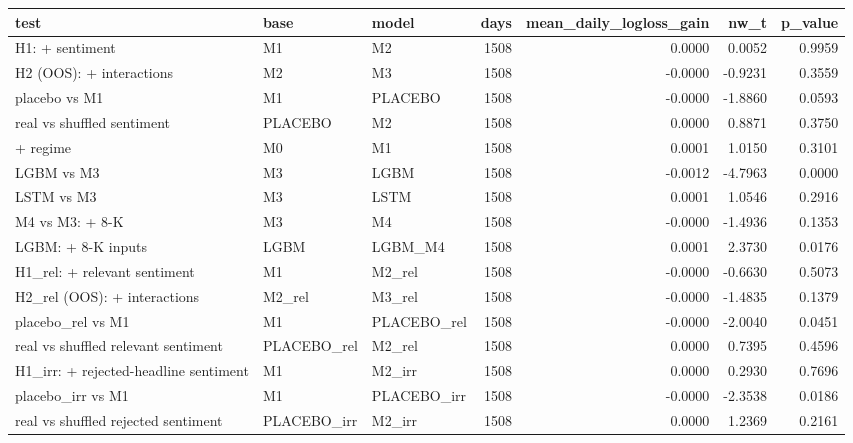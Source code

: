 \begin{tabular}{lllrrrr}
\toprule
test & base & model & days & mean\_daily\_logloss\_gain & nw\_t & p\_value \\
\midrule
H1: + sentiment & M1 & M2 & 1508 & 0.0000 & 0.0052 & 0.9959 \\
H2 (OOS): + interactions & M2 & M3 & 1508 & -0.0000 & -0.9231 & 0.3559 \\
placebo vs M1 & M1 & PLACEBO & 1508 & -0.0000 & -1.8860 & 0.0593 \\
real vs shuffled sentiment & PLACEBO & M2 & 1508 & 0.0000 & 0.8871 & 0.3750 \\
+ regime & M0 & M1 & 1508 & 0.0001 & 1.0150 & 0.3101 \\
LGBM vs M3 & M3 & LGBM & 1508 & -0.0012 & -4.7963 & 0.0000 \\
LSTM vs M3 & M3 & LSTM & 1508 & 0.0001 & 1.0546 & 0.2916 \\
M4 vs M3: + 8-K & M3 & M4 & 1508 & -0.0000 & -1.4936 & 0.1353 \\
LGBM: + 8-K inputs & LGBM & LGBM\_M4 & 1508 & 0.0001 & 2.3730 & 0.0176 \\
H1\_rel: + relevant sentiment & M1 & M2\_rel & 1508 & -0.0000 & -0.6630 & 0.5073 \\
H2\_rel (OOS): + interactions & M2\_rel & M3\_rel & 1508 & -0.0000 & -1.4835 & 0.1379 \\
placebo\_rel vs M1 & M1 & PLACEBO\_rel & 1508 & -0.0000 & -2.0040 & 0.0451 \\
real vs shuffled relevant sentiment & PLACEBO\_rel & M2\_rel & 1508 & 0.0000 & 0.7395 & 0.4596 \\
H1\_irr: + rejected-headline sentiment & M1 & M2\_irr & 1508 & 0.0000 & 0.2930 & 0.7696 \\
placebo\_irr vs M1 & M1 & PLACEBO\_irr & 1508 & -0.0000 & -2.3538 & 0.0186 \\
real vs shuffled rejected sentiment & PLACEBO\_irr & M2\_irr & 1508 & 0.0000 & 1.2369 & 0.2161 \\
\bottomrule
\end{tabular}

